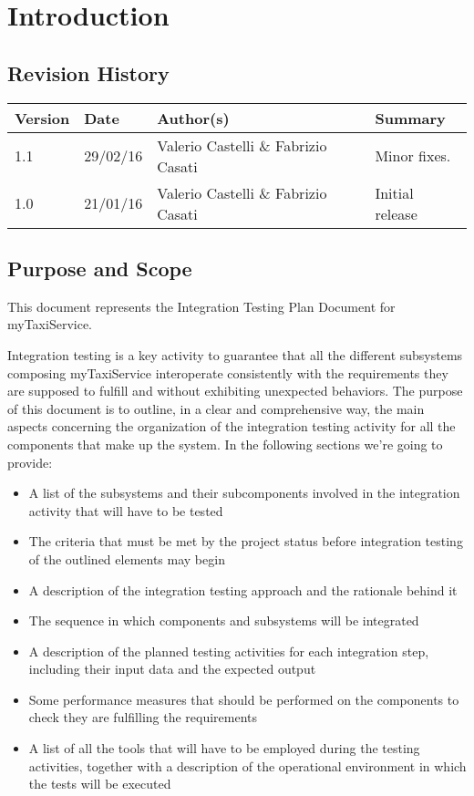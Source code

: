\chapter{Introduction}
\section{Revision History}
\begin{center}
\begin{longtable}{|l|l|l|l|}
\hline
Version &
Date &
Author(s) &
Summary \\
\hline
1.1 &
29/02/16 &
Valerio Castelli \& Fabrizio Casati &
Minor fixes. \\\hline
1.0 &
21/01/16 &
Valerio Castelli \& Fabrizio Casati &
Initial release \\
\hline
\end{longtable}
\end{center}

\section{Purpose and Scope}
This document represents the Integration Testing Plan Document for myTaxiService. 

Integration testing is a key activity to guarantee that all the different subsystems composing myTaxiService interoperate consistently with the requirements they are supposed to fulfill and without exhibiting unexpected behaviors. 
The purpose of this document is to outline, in a clear and comprehensive way, the main aspects concerning the organization of the integration testing activity for all the components that make up the system.
In the following sections we're going to provide:
\begin{itemize}
	\item A list of the subsystems and their subcomponents involved in the integration activity that will have to be tested
	\item The criteria that must be met by the project status before integration testing of the outlined elements may begin 
	\item A description of the integration testing approach and the rationale behind it
	\item The sequence in which components and subsystems will be integrated 
	\item A description of the planned testing activities for each integration step, including their input data and the expected output 
	\item Some performance measures that should be performed on the components to check they are fulfilling the requirements
	\item A list of all the tools that will have to be employed during the testing activities, together with a description of the operational environment in which the tests will be executed
\end{itemize}
